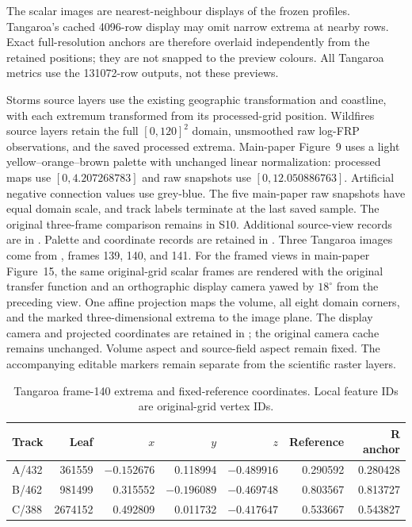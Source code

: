 The scalar images are nearest-neighbour displays of the frozen profiles. Tangaroa's cached 4096-row display may omit narrow extrema at nearby rows. Exact full-resolution anchors are therefore overlaid independently from the retained positions; they are not snapped to the preview colours. All Tangaroa metrics use the 131072-row outputs, not these previews.

Storms source layers use the existing geographic transformation and coastline, with each extremum transformed from its processed-grid position. Wildfires source layers retain the full $[0,120]^2$ domain, unsmoothed raw log-FRP observations, and the saved processed extrema. Main-paper Figure~9 uses a light yellow--orange--brown palette with unchanged linear normalization: processed maps use $[0,4.207268783]$ and raw snapshots use $[0,12.050886763]$. Artificial negative connection values use grey-blue. The five main-paper raw snapshots have equal domain scale, and track labels terminate at the last saved sample. The original three-frame comparison remains in S10. Additional source-view records are in . Palette and coordinate records are retained in . Three Tangaroa images come from , frames 139, 140, and 141. For the framed views in main-paper Figure~15, the same original-grid scalar frames are rendered with the original transfer function and an orthographic display camera yawed by $18^\circ$ from the preceding view. One affine projection maps the volume, all eight domain corners, and the marked three-dimensional extrema to the image plane. The display camera and projected coordinates are retained in ; the original camera cache remains unchanged. Volume aspect and source-field aspect remain fixed. The accompanying editable markers remain separate from the scientific raster layers.

\begin{table}[H]\centering\small
\caption{Tangaroa frame-140 extrema and fixed-reference coordinates. Local feature IDs are original-grid vertex IDs.}
\setlength{\tabcolsep}{4pt}
\begin{tabular}{lrrrrrr}\toprule
Track & Leaf & $x$ & $y$ & $z$ & Reference & R anchor\\\midrule
A/432 & 361559 & $-0.152676$ & 0.118994 & $-0.489916$ & 0.290592 & 0.280428\\
B/462 & 981499 & 0.315552 & $-0.196089$ & $-0.469748$ & 0.803567 & 0.813727\\
C/388 & 2674152 & 0.492809 & 0.011732 & $-0.417647$ & 0.533667 & 0.543827\\\bottomrule\end{tabular}
\end{table}

